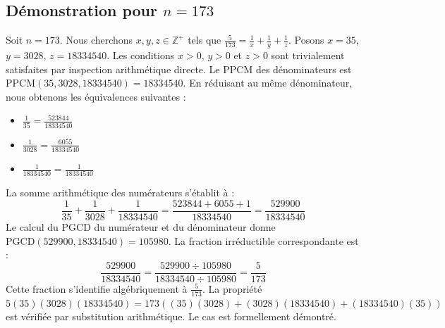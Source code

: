 \documentclass[12pt,a4paper]{article}
\begin{document}
\subsection{Démonstration pour $n = 173$}
Soit $n = 173$. Nous cherchons $x, y, z \in \mathbb{Z}^{+}$ tels que $\frac{5}{173} = \frac{1}{x} + \frac{1}{y} + \frac{1}{z}$.
Posons $x = 35$, $y = 3028$, $z = 18334540$.
Les conditions $x > 0$, $y > 0$ et $z > 0$ sont trivialement satisfaites par inspection arithmétique directe.
Le PPCM des dénominateurs est $\text{PPCM}(35, 3028, 18334540) = 18334540$.
En réduisant au même dénominateur, nous obtenons les équivalences suivantes :
\begin{itemize}
    \item $\frac{1}{35} = \frac{523844}{18334540}$
    \item $\frac{1}{3028} = \frac{6055}{18334540}$
    \item $\frac{1}{18334540} = \frac{1}{18334540}$
\end{itemize}
La somme arithmétique des numérateurs s'établit à :
$$ \frac{1}{35} + \frac{1}{3028} + \frac{1}{18334540} = \frac{523844 + 6055 + 1}{18334540} = \frac{529900}{18334540} $$
Le calcul du PGCD du numérateur et du dénominateur donne $\text{PGCD}(529900, 18334540) = 105980$.
La fraction irréductible correspondante est :
$$ \frac{529900}{18334540} = \frac{529900 \div 105980}{18334540 \div 105980} = \frac{5}{173} $$
Cette fraction s'identifie algébriquement à $\frac{5}{173}$.
La propriété $5(35)(3028)(18334540) = 173((35)(3028) + (3028)(18334540) + (18334540)(35))$ est vérifiée par substitution arithmétique.
Le cas est formellement démontré.
\end{document}
